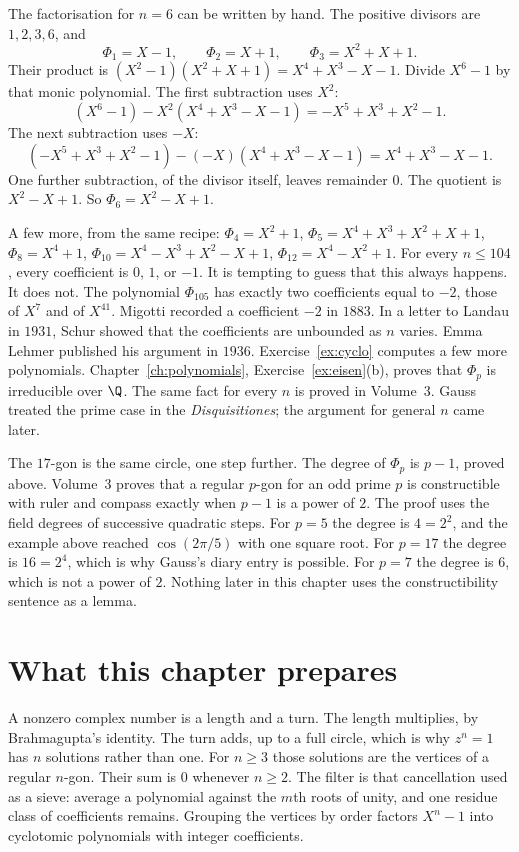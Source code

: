 \begin{examplex}
The factorisation for $n=6$ can be written by hand. The positive divisors are $1,2,3,6$, and
\[
\Phi_1=X-1,\qquad\Phi_2=X+1,\qquad\Phi_3=X^2+X+1.
\]
Their product is $(X^2-1)(X^2+X+1)=X^4+X^3-X-1$. Divide $X^6-1$ by that monic polynomial. The first subtraction uses $X^2$:
\[
(X^6-1)-X^2(X^4+X^3-X-1)=-X^5+X^3+X^2-1.
\]
The next subtraction uses $-X$:
\[
(-X^5+X^3+X^2-1)-(-X)(X^4+X^3-X-1)=X^4+X^3-X-1.
\]
One further subtraction, of the divisor itself, leaves remainder $0$. The quotient is $X^2-X+1$. So $\Phi_6=X^2-X+1$.

A few more, from the same recipe: $\Phi_4=X^2+1$, $\Phi_5=X^4+X^3+X^2+X+1$, $\Phi_8=X^4+1$, $\Phi_{10}=X^4-X^3+X^2-X+1$, $\Phi_{12}=X^4-X^2+1$. For every $n\le104$, every coefficient is $0$, $1$, or $-1$. It is tempting to guess that this always happens. It does not. The polynomial $\Phi_{105}$ has exactly two coefficients equal to $-2$, those of $X^7$ and of $X^{41}$. Migotti recorded a coefficient $-2$ in $1883$. In a letter to Landau in $1931$, Schur showed that the coefficients are unbounded as $n$ varies. Emma Lehmer published his argument in $1936$. Exercise~\ref{ex:cyclo} computes a few more polynomials. Chapter~\ref{ch:polynomials}, Exercise~\ref{ex:eisen}(b), proves that $\Phi_p$ is irreducible over $\Q$. The same fact for every $n$ is proved in Volume~3. Gauss treated the prime case in the \emph{Disquisitiones}; the argument for general $n$ came later.
\end{examplex}


The $17$-gon is the same circle, one step further. The degree of $\Phi_p$ is $p-1$, proved above. Volume~3 proves that a regular $p$-gon for an odd prime $p$ is constructible with ruler and compass exactly when $p-1$ is a power of $2$. The proof uses the field degrees of successive quadratic steps. For $p=5$ the degree is $4=2^2$, and the example above reached $\cos(2\pi/5)$ with one square root. For $p=17$ the degree is $16=2^4$, which is why Gauss's diary entry is possible. For $p=7$ the degree is $6$, which is not a power of $2$. Nothing later in this chapter uses the constructibility sentence as a lemma.

\section*{What this chapter prepares}
A nonzero complex number is a length and a turn. The length multiplies, by Brahmagupta's identity. The turn adds, up to a full circle, which is why $z^n=1$ has $n$ solutions rather than one. For $n\ge3$ those solutions are the vertices of a regular $n$-gon. Their sum is $0$ whenever $n\ge2$. The filter is that cancellation used as a sieve: average a polynomial against the $m$th roots of unity, and one residue class of coefficients remains. Grouping the vertices by order factors $X^n-1$ into cyclotomic polynomials with integer coefficients.

